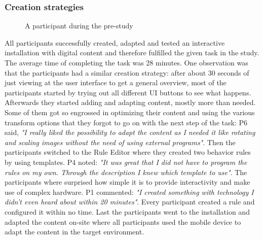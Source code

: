 \subsubsection{Creation strategies}

\begin{figure}
\hfill
{}\hfill
\caption{A participant during the pre-study}
\end{figure}

All participants successfully created, adapted and tested an interactive installation with digital content and therefore fulfilled the given task in the study. The average time of completing the task was 28 minutes. One  observation was that the participants had a similar creation strategy: after about 30 seconds of just viewing at the user interface to get a general overview, most of the participants started by trying out all different UI buttons to see what happens. Afterwards they started adding and adapting content, mostly more than needed. Some of them got so engrossed in optimizing their content and using the various transform options that they forgot to go on with the next step of the task: P6 said, \textit{"I really liked the possibility to adapt the content as I needed it like rotating and scaling images without the need of using external programs"}. Then the participants switched to the Rule Editor where they created two behavior rules by using templates. P4 noted: \textit{"It was great that I did not have to program the rules on my own. Through the description I knew which template to use"}. The participants where surprised how simple it is to provide interactivity and make use of complex hardware. P1 commented: \textit{"I created something with technology I didn't even heard about within 20 minutes"}. Every participant created a rule and configured it within no time. Last the participants went to the installation and adapted the content on-site where all participants used the mobile device to adapt the content in the target environment. 

